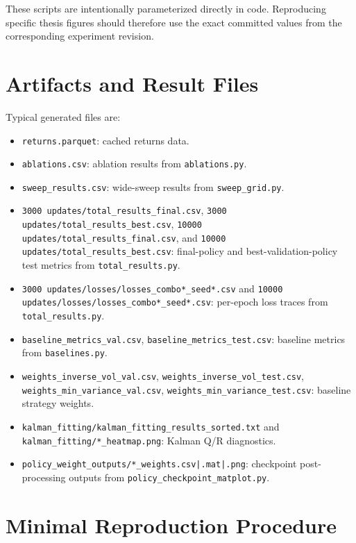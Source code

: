 These scripts are intentionally parameterized directly in code. Reproducing
specific thesis figures should therefore use the exact committed values from
the corresponding experiment revision.

\section{Artifacts and Result Files}

Typical generated files are:
\begin{itemize}
    \item \texttt{returns.parquet}: cached returns data.
    \item \texttt{ablations.csv}: ablation results from \texttt{ablations.py}.
    \item \texttt{sweep\_results.csv}: wide-sweep results from \texttt{sweep\_grid.py}.
    \item \texttt{3000 updates/total\_results\_final.csv},
    \texttt{3000 updates/total\_results\_best.csv},
    \texttt{10000 updates/total\_results\_final.csv}, and
    \texttt{10000 updates/total\_results\_best.csv}:
    final-policy and best-validation-policy test metrics from \texttt{total\_results.py}.
    \item \texttt{3000 updates/losses/losses\_combo*\_seed*.csv} and
    \texttt{10000 updates/losses/losses\_combo*\_seed*.csv}:
    per-epoch loss traces from \texttt{total\_results.py}.
    \item \texttt{baseline\_metrics\_val.csv}, \texttt{baseline\_metrics\_test.csv}:
    baseline metrics from \texttt{baselines.py}.
    \item \texttt{weights\_inverse\_vol\_val.csv}, \texttt{weights\_inverse\_vol\_test.csv},
    \texttt{weights\_min\_variance\_val.csv}, \texttt{weights\_min\_variance\_test.csv}:
    baseline strategy weights.
    \item \texttt{kalman\_fitting/kalman\_fitting\_results\_sorted.txt} and
    \texttt{kalman\_fitting/*\_heatmap.png}: Kalman Q/R diagnostics.
    \item \texttt{policy\_weight\_outputs/*\_weights.csv|.mat|.png}: checkpoint
    post-processing outputs from \texttt{policy\_checkpoint\_matplot.py}.
\end{itemize}

\section{Minimal Reproduction Procedure}

